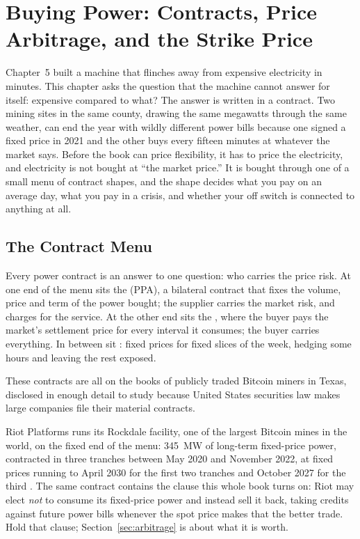 \chapter{Buying Power: Contracts, Price Arbitrage, and the Strike Price}
\label{ch:buying}

Chapter~5 built a machine that flinches away from expensive electricity in minutes. This chapter asks the question that the machine cannot answer for itself: expensive compared to what? The answer is written in a contract. Two mining sites in the same county, drawing the same megawatts through the same weather, can end the year with wildly different power bills because one signed a fixed price in 2021 and the other buys every fifteen minutes at whatever the market says. Before the book can price flexibility, it has to price the electricity, and electricity is not bought at ``the market price.'' It is bought through one of a small menu of contract shapes, and the shape decides what you pay on an average day, what you pay in a crisis, and whether your off switch is connected to anything at all.

\section{The Contract Menu}

Every power contract is an answer to one question: who carries the price risk. At one end of the menu sits the  (PPA), a bilateral contract that fixes the volume, price and term of the power bought; the supplier carries the market risk, and charges for the service. At the other end sits the , where the buyer pays the market's settlement price for every interval it consumes; the buyer carries everything. In between sit : fixed prices for fixed slices of the week, hedging some hours and leaving the rest exposed.

These contracts are all on the books of publicly traded Bitcoin miners in Texas, disclosed in enough detail to study because United States securities law makes large companies file their material contracts.

Riot Platforms runs its Rockdale facility, one of the largest Bitcoin mines in the world, on the fixed end of the menu: 345~MW of long-term fixed-price power, contracted in three tranches between May 2020 and November 2022, at fixed prices running to April 2030 for the first two tranches and October 2027 for the third \autocite{riot10k2024}. %
The same contract contains the clause this whole book turns on: Riot may elect \emph{not} to consume its fixed-price power and instead sell it back, taking credits against future power bills whenever the spot price makes that the better trade. %
Hold that clause; Section~\ref{sec:arbitrage} is about what it is worth.

